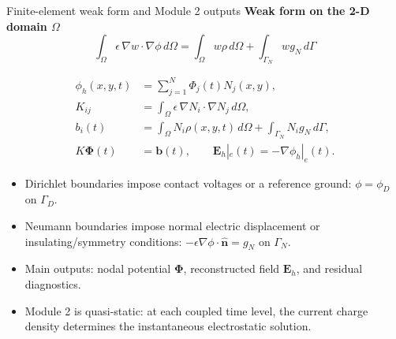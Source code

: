 \documentclass[aspectratio=169,10pt]{beamer}
\newcommand{\Evec}{\mathbf{E}}
\begin{document}
\begin{frame}{Finite-element weak form and Module 2 outputs}
\footnotesize
\textbf{Weak form on the 2-D domain $\Omega$}
\vspace{-0.25em}
\begin{equation*}
\boxed{
\int_{\Omega} \epsilon\,\nabla w\cdot\nabla\phi\,d\Omega
=
\int_{\Omega} w\rho\,d\Omega
+
\int_{\Gamma_N} w g_N\,d\Gamma
}
\end{equation*}

\vspace{-0.5em}
\begin{align*}
\phi_h(x,y,t) &= \sum_{j=1}^{N} \Phi_j(t)N_j(x,y),\\[-0.15em]
K_{ij} &= \int_{\Omega}\epsilon\,\nabla N_i\cdot\nabla N_j\,d\Omega,\\[-0.15em]
b_i(t) &= \int_{\Omega}N_i\rho(x,y,t)\,d\Omega
+\int_{\Gamma_N}N_i g_N\,d\Gamma,\\[-0.15em]
K\bm{\Phi}(t)&=\bm b(t),
\qquad
\Evec_h|_e(t)=-\nabla\phi_h|_e(t).
\end{align*}

\vspace{-0.15em}
\begin{itemize}
    \item Dirichlet boundaries impose contact voltages or a reference ground: $\phi=\phi_D$ on $\Gamma_D$.
    \item Neumann boundaries impose normal electric displacement or insulating/symmetry conditions: $-\epsilon\nabla\phi\cdot\hat{\mathbf n}=g_N$ on $\Gamma_N$.
    \item Main outputs: nodal potential $\bm\Phi$, reconstructed field $\Evec_h$, and residual diagnostics.
    \item Module 2 is quasi-static: at each coupled time level, the current charge density determines the instantaneous electrostatic solution.
\end{itemize}
\end{frame}
\end{document}
